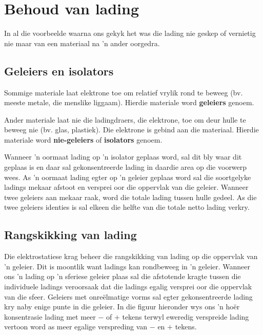             
\section{Behoud van lading}
            \nopagebreak

In al die voorbeelde waarna ons gekyk het was die lading nie geskep of vernietig nie maar van een materiaal na 'n ander oorgedra.


\subsection*{Geleiers en isolators}
    \nopagebreak

Sommige materiale laat elektrone toe om relatief vrylik rond te beweeg (bv. meeste metale, die menslike liggaam). Hierdie materiale word \textbf{geleiers} genoem. \par
{}

Ander materiale laat nie die ladingdraers, die elektrone, toe om deur hulle te beweeg nie (bv. glas, plastiek). Die elektrone is gebind aan die materiaal. Hierdie materiale word \textbf{nie-geleiers} of \textbf{isolators} genoem. \par


Wanneer 'n oormaat lading op 'n isolator geplaas word, sal dit bly waar dit geplaas is en daar sal gekonsentreerde lading in daardie area op die voorwerp wees. As 'n oormaat lading egter op 'n geleier geplaas word sal die soortgelyke ladings mekaar afstoot en versprei oor die oppervlak van die geleier. Wanneer twee geleiers aan mekaar raak, word die totale lading tussen hulle gedeel. As die twee geleiers identies is sal elkeen die helfte van die totale netto lading verkry. \par

\subsection*{Rangskikking van lading}

Die elektrostatiese krag beheer die rangskikking van lading op die oppervlak van 'n geleier. Dit is moontlik want ladings kan rondbeweeg in 'n geleier. Wanneer ons 'n lading op 'n sferiese geleier plaas sal die afstotende kragte tussen die individuele ladings veroorsaak dat die ladings egalig versprei oor die oppervlak van die sfeer. Geleiers met onre\"elmatige vorms sal egter gekonsentreerde lading kry naby enige punte in die geleier. In die figuur hieronder wys ons 'n ho\"er konsentrasie lading met meer $-$ of $+$ tekens terwyl eweredig verspreide lading vertoon word as meer egalige verspreding van $-$ en $+$ tekens.\par


